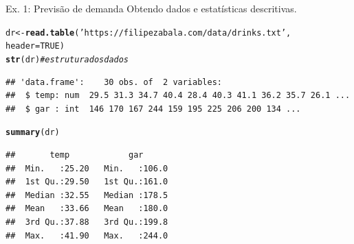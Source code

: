 \documentclass{beamer}\usepackage[]{graphicx}\usepackage[]{xcolor}
\makeatletter
\newcommand{\hlnum}[1]{\textcolor[rgb]{0.686,0.059,0.569}{#1}}%
\newcommand{\hlsng}[1]{\textcolor[rgb]{0.192,0.494,0.8}{#1}}%
\newcommand{\hlcom}[1]{\textcolor[rgb]{0.678,0.584,0.686}{\textit{#1}}}%
\newcommand{\hldef}[1]{\textcolor[rgb]{0.345,0.345,0.345}{#1}}%
\newcommand{\hlkwb}[1]{\textcolor[rgb]{0.69,0.353,0.396}{#1}}%
\newcommand{\hlkwc}[1]{\textcolor[rgb]{0.333,0.667,0.333}{#1}}%
\newcommand{\hlkwd}[1]{\textcolor[rgb]{0.737,0.353,0.396}{\textbf{#1}}}%
\newenvironment{kframe}{%
 \def\at@end@of@kframe{}%
 \ifinner\ifhmode%
  \def\at@end@of@kframe{\end{minipage}}%
  \begin{minipage}{\columnwidth}%
 \fi\fi%
 \def\FrameCommand##1{\hskip\@totalleftmargin \hskip-\fboxsep
 \colorbox{shadecolor}{##1}\hskip-\fboxsep
     \hskip-\linewidth \hskip-\@totalleftmargin \hskip\columnwidth}%
 \MakeFramed {\advance\hsize-\width
   \@totalleftmargin\z@ \linewidth\hsize
   \@setminipage}}%
 {\par\unskip\endMakeFramed%
 \at@end@of@kframe}
\newenvironment{knitrout}{}{} %
\makeatother
\begin{document}
\begin{frame}[fragile]{Ex. 1: Previsão de demanda}
\fontsize{8pt}{8pt}\selectfont
Obtendo dados e estatísticas descritivas.
\begin{knitrout}
\color{fgcolor}\begin{kframe}
\begin{alltt}
\hldef{dr} \hlkwb{<-} \hlkwd{read.table}\hldef{(}\hlsng{'https://filipezabala.com/data/drinks.txt'}\hldef{,}
                 \hlkwc{header} \hldef{=} \hlnum{TRUE}\hldef{)}
\hlkwd{str}\hldef{(dr)}  \hlcom{# estrutura dos dados}
\end{alltt}
\begin{verbatim}
## 'data.frame':	30 obs. of  2 variables:
##  $ temp: num  29.5 31.3 34.7 40.4 28.4 40.3 41.1 36.2 35.7 26.1 ...
##  $ gar : int  146 170 167 244 159 195 225 206 200 134 ...
\end{verbatim}
\begin{alltt}
\hlkwd{summary}\hldef{(dr)}
\end{alltt}
\begin{verbatim}
##       temp            gar       
##  Min.   :25.20   Min.   :106.0  
##  1st Qu.:29.50   1st Qu.:161.0  
##  Median :32.55   Median :178.5  
##  Mean   :33.66   Mean   :180.0  
##  3rd Qu.:37.88   3rd Qu.:199.8  
##  Max.   :41.90   Max.   :244.0
\end{verbatim}
\end{kframe}
\end{knitrout}
\end{frame}
\end{document}
